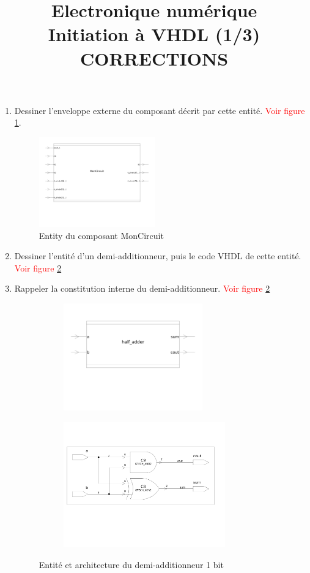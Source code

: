 \documentclass[a4paper,11pt]{article}
\title{{\Huge Electronique numérique}\\Initiation à VHDL (1/3)\\CORRECTIONS}
\date{}
\begin{document}
\maketitle
\begin{enumerate}
  \item Dessiner l'enveloppe externe du composant décrit par cette entité.
  \textcolor{red}{Voir figure \ref{moncircuit}}.
  \begin{figure}
    \centering
    \includegraphics[width=5cm]{./code/entity_mon_circuit.pdf}
    \caption{Entity du composant MonCircuit}
    \label{moncircuit}
  \end{figure}

  \item Dessiner l'entité d'un demi-additionneur, puis le code VHDL de cette entité.
  \textcolor{red}{Voir figure \ref{fig:ha}}
  \item Rappeler la constitution interne du demi-additionneur.
  \textcolor{red}{Voir figure \ref{fig:ha}}

  \begin{figure}
    \centering
    \begin{subfigure}{.5\textwidth}
      \centering
      \includegraphics[width=6cm]{./code/entity_half_adder.pdf}
    \end{subfigure}%
    \begin{subfigure}{.5\textwidth}
      \centering
      \includegraphics[width=7cm]{./code/arch_half_adder.pdf}
    \end{subfigure}
    \caption{Entité et architecture du demi-additionneur 1 bit}
    \label{fig:ha}
  \end{figure}


\end{enumerate}
\end{document}
